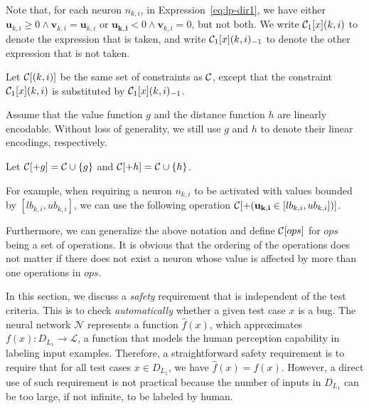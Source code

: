 \documentclass[runningheads,a4paper]{llncs}
\newcommand{\labels}{\mathcal{L}}
\newcommand{\networks}{\mathcal{N}}
\newcommand{\valuefunction}{g}
\newcommand{\distancefunction}{h}
\begin{document}
Note that, for each neuron $n_{k,i}$, in Expression~\ref{eq:lp-dir1}, we
have either $\mathbf{u}_{k,i}\geq 0 \wedge
\mathbf{v}_{k,i}=\mathbf{u}_{k,i}$ or $\mathbf{u_{k,i}}< 0 \wedge
\mathbf{v}_{k,i}=0$, but not both.  We write $\mathcal{C}_1[x](k,i)$ to
denote the expression that is taken, and write $\mathcal{C}_1[x](k,i)_{-1}$
to denote the other expression that is not taken.

\begin{definition}\label{def:ap-except}
Let $\mathcal{C}[(k,i)]$ be the same set of constraints as $\mathcal{C}$,
except that the constraint  $\mathcal{C}_1[x](k,i)$ is substituted by
$\mathcal{C}_1[x](k,i)_{-1}$.
\end{definition}

Assume that the value function $\valuefunction$ and the distance function
$\distancefunction$ are linearly encodable.  Without loss of generality, we
still use $\valuefunction$ and $\distancefunction$ to denote their linear
encodings, respectively.

\begin{definition}
Let $\constraints[+\valuefunction]= \constraints\cup \{\valuefunction\}$ and $\constraints[+\distancefunction]=\constraints\cup \{\distancefunction \}$.  
\end{definition}%
For example, when requiring a neuron $n_{k,i}$ to be activated with values
bounded by $[lb_{k,i}, ub_{k,i}]$, we can use the following operation
$\mathcal{C}[+ (\mathbf{u_{k,i}} \in [lb_{k,i}, ub_{k,i}])]$.

Furthermore, we can generalize the above notation and define
$\mathcal{C}[ops]$ for $ops$ being a set of operations.  It is obvious that
the ordering of the operations does not matter if there does not exist a
neuron whose value is affected by more than one operations in $ops$.


In this section, we discuss a \emph{safety} requirement that is independent of the test criteria. This is to check \emph{automatically} whether a given test case $x$ is a bug. 
The neural network  $\networks$ represents a function $\hat{f}(x)$, which approximates $f(x): D_{L_1} \to \labels$, a function that models the human perception capability in labeling input examples.
Therefore, a straightforward safety requirement is to require that for all test cases $x\in D_{L_1}$, we have $\hat{f}(x) = f(x)$. However, a direct use of such  requirement is not practical because the number of inputs in $D_{L_1}$  can be too large, if not infinite, to be labeled by human. 
\end{document}
